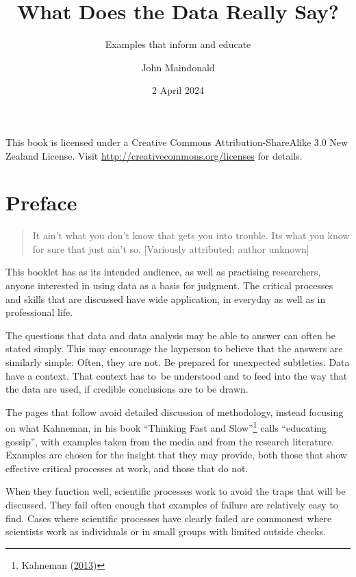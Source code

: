 \documentclass[
  10pt,
  b5paper]{book}
\title{What Does the Data Really Say?}
\subtitle{Examples that inform and educate}
\author{John Maindonald}
\date{2 April 2024}
\begin{document}
\maketitle

\newpage
This book is licensed under a Creative
Commons Attribution-ShareAlike 3.0 New Zealand License.
Visit \url{http://creativecommons.org/licenses} for details.


{
\hypersetup{linkcolor=}
\setcounter{tocdepth}{1}
\tableofcontents
}
\renewcommand{\bibname}{References}

\hypertarget{preface}{%
\chapter*{Preface}\label{preface}}

\begin{quote}
It ain't what you don't know that gets you into trouble.
Its what you know for sure that just ain't so.
{[}Variously attributed; author unknown{]}
\end{quote}

This booklet has as its intended audience, as well as practising
researchers, anyone interested in using data as a basis for
judgment. The critical processes and skills that are discussed
have wide application, in everyday as well as in professional life.

The questions that data and data analysis may be able to answer can
often be stated simply. This may encourage the layperson to believe
that the answers are similarly simple. Often, they are not. Be
prepared for unexpected subtleties. Data have a context. That
context has to~be understood and to feed into the way that the data
are used, if credible conclusions are to be drawn.

The pages that follow avoid detailed discussion of methodology,
instead focusing on what Kahneman, in his book
``Thinking Fast and Slow''\footnote{Kahneman (\protect\hyperlink{ref-kahneman_2013}{2013})} calls ``educating gossip'',
with examples taken from the media and from the research literature.
Examples are chosen for the insight that they may provide, both
those that show effective critical processes at work, and those
that do not.

When they function well, scientific processes work to avoid the
traps that will be discussed. They fail often enough that examples
of failure are relatively easy to find. Cases where scientific
processes have clearly failed are commonest where scientists work
as individuals or in small groups with limited outside checks.
\end{document}
